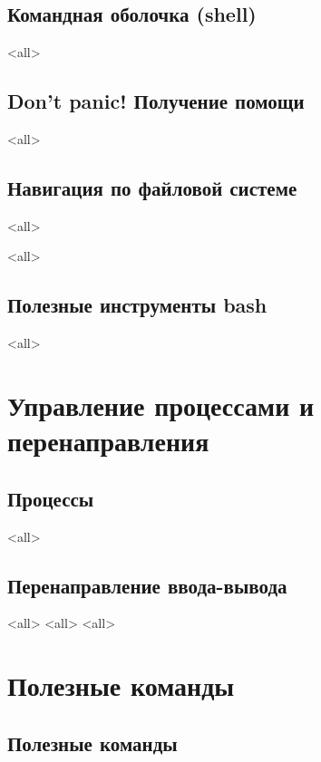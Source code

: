 \section{Командная оболочка (shell)}

\mode<all>{}

\section{Don't panic! Получение помощи}

\mode<all>{}

\section{Навигация по файловой системе}

\mode<all>{}

\mode<all>{}

\section{Полезные инструменты bash}
\mode<all>{}

\chapter{Управление процессами и перенаправления}

\section{Процессы}
\mode<all>{}

\section{Перенаправление ввода-вывода}
\mode<all>{}
\mode<all>{}
\mode<all>{}

\chapter{Полезные команды}

\section{Полезные команды}

